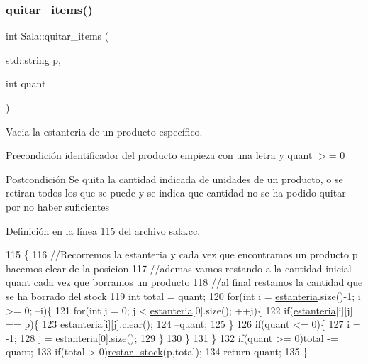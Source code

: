 \subsubsection{\texorpdfstring{quitar\+\_\+items()}{quitar\_items()}}
{\footnotesize\ttfamily int Sala\+::quitar\+\_\+items (\begin{DoxyParamCaption}\item[{std\+::string}]{p,  }\item[{int}]{quant }\end{DoxyParamCaption})}



Vacia la estanteria de un producto específico. 

\begin{DoxyPrecond}{Precondición}
identificador del producto empieza con una letra y quant $>$= 0 
\end{DoxyPrecond}
\begin{DoxyPostcond}{Postcondición}
Se quita la cantidad indicada de unidades de un producto, o se retiran todos los que se puede y se indica que cantidad no se ha podido quitar por no haber suficientes 
\end{DoxyPostcond}


Definición en la línea 115 del archivo sala.\+cc.


\begin{DoxyCode}
115                                           \{
116     \textcolor{comment}{//Recorremos la estanteria y cada vez que encontramos un producto p hacemos clear de la posicion}
117     \textcolor{comment}{//ademas vamos restando a la cantidad inicial quant cada vez que borramos un producto}
118     \textcolor{comment}{//al final restamos la cantidad que se ha borrado del stock }
119     \textcolor{keywordtype}{int} total = quant;
120     \textcolor{keywordflow}{for}(\textcolor{keywordtype}{int} i = \mbox{\hyperlink{class_sala_a8f5264818c98db9c0d075c51a7672d95}{estanteria}}.size()-1; i >= 0; --i)\{
121         \textcolor{keywordflow}{for}(\textcolor{keywordtype}{int} j = 0; j < \mbox{\hyperlink{class_sala_a8f5264818c98db9c0d075c51a7672d95}{estanteria}}[0].size(); ++j)\{
122             \textcolor{keywordflow}{if}(\mbox{\hyperlink{class_sala_a8f5264818c98db9c0d075c51a7672d95}{estanteria}}[i][j] == p)\{
123                 \mbox{\hyperlink{class_sala_a8f5264818c98db9c0d075c51a7672d95}{estanteria}}[i][j].clear();
124                 --quant;
125             \}
126             \textcolor{keywordflow}{if}(quant <= 0)\{
127                 i = -1;
128                 j = \mbox{\hyperlink{class_sala_a8f5264818c98db9c0d075c51a7672d95}{estanteria}}[0].size();
129             \}  
130         \}
131     \}
132     \textcolor{keywordflow}{if}(quant >= 0)total -= quant;
133     \textcolor{keywordflow}{if}(total > 0)\mbox{\hyperlink{class_sala_a3f2485d40f7d90ca5eb8142dbadd5993}{restar\_stock}}(p,total);  
134     \textcolor{keywordflow}{return} quant;    
135 \}
\end{DoxyCode}
\mbox{\label{class_sala_a91e0acab4f56f3a5cbcad80afe163de8}} 

